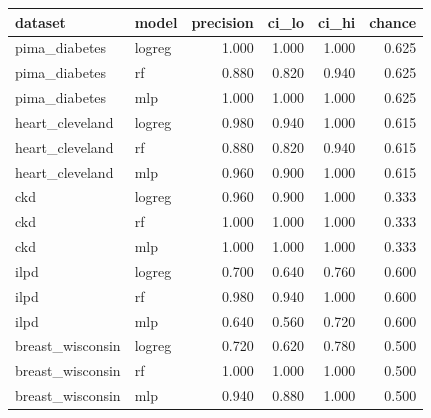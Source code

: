 \begin{tabular}{llrrrr}
\toprule
dataset & model & precision & ci\_lo & ci\_hi & chance \\
\midrule
pima\_diabetes & logreg & 1.000 & 1.000 & 1.000 & 0.625 \\
pima\_diabetes & rf & 0.880 & 0.820 & 0.940 & 0.625 \\
pima\_diabetes & mlp & 1.000 & 1.000 & 1.000 & 0.625 \\
heart\_cleveland & logreg & 0.980 & 0.940 & 1.000 & 0.615 \\
heart\_cleveland & rf & 0.880 & 0.820 & 0.940 & 0.615 \\
heart\_cleveland & mlp & 0.960 & 0.900 & 1.000 & 0.615 \\
ckd & logreg & 0.960 & 0.900 & 1.000 & 0.333 \\
ckd & rf & 1.000 & 1.000 & 1.000 & 0.333 \\
ckd & mlp & 1.000 & 1.000 & 1.000 & 0.333 \\
ilpd & logreg & 0.700 & 0.640 & 0.760 & 0.600 \\
ilpd & rf & 0.980 & 0.940 & 1.000 & 0.600 \\
ilpd & mlp & 0.640 & 0.560 & 0.720 & 0.600 \\
breast\_wisconsin & logreg & 0.720 & 0.620 & 0.780 & 0.500 \\
breast\_wisconsin & rf & 1.000 & 1.000 & 1.000 & 0.500 \\
breast\_wisconsin & mlp & 0.940 & 0.880 & 1.000 & 0.500 \\
\bottomrule
\end{tabular}
